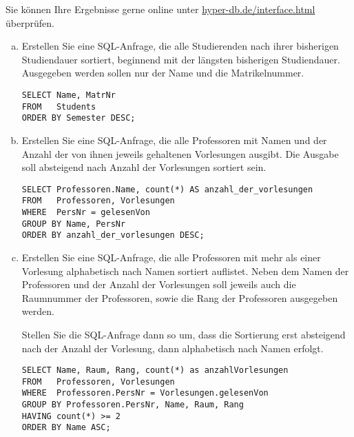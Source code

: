 \begin{normalText}

Sie können Ihre Ergebnisse gerne online unter \href{https://hyper-db.de/interface.html}{hyper-db.de/interface.html} überprüfen.

\begin{enumerate}[a)]
	\item Erstellen Sie eine SQL-Anfrage, die alle Studierenden nach ihrer 
	bisherigen Studiendauer sortiert, beginnend mit der längsten bisherigen 
	Studiendauer.
	Ausgegeben werden sollen nur der Name und die Matrikelnummer.

\cprotEnv
	\begin{note}
	\begin{lstlisting}
SELECT Name, MatrNr
FROM   Students
ORDER BY Semester DESC;
	\end{lstlisting}
	\end{note}

	\item Erstellen Sie eine SQL-Anfrage, die alle Professoren mit Namen und der Anzahl der von ihnen jeweils gehaltenen Vorlesungen ausgibt.
	Die Ausgabe soll absteigend nach Anzahl der Vorlesungen sortiert sein.

\cprotEnv
	\begin{note}
	\begin{lstlisting}
SELECT Professoren.Name, count(*) AS anzahl_der_vorlesungen
FROM   Professoren, Vorlesungen
WHERE  PersNr = gelesenVon
GROUP BY Name, PersNr
ORDER BY anzahl_der_vorlesungen DESC;
	\end{lstlisting}
	\end{note}

	\item Erstellen Sie eine SQL-Anfrage, die alle Professoren mit mehr als einer Vorlesung alphabetisch nach Namen sortiert auflistet.
	Neben dem Namen der Professoren und der Anzahl der Vorlesungen soll jeweils auch die Raumnummer der Professoren, sowie die Rang der Professoren ausgegeben werden.

	Stellen Sie die SQL-Anfrage dann so um, dass die Sortierung erst absteigend nach der Anzahl der Vorlesung, dann alphabetisch nach Namen erfolgt.

\cprotEnv
	\begin{note}
	\begin{lstlisting}
SELECT Name, Raum, Rang, count(*) as anzahlVorlesungen
FROM   Professoren, Vorlesungen
WHERE  Professoren.PersNr = Vorlesungen.gelesenVon
GROUP BY Professoren.PersNr, Name, Raum, Rang
HAVING count(*) >= 2
ORDER BY Name ASC;
	\end{lstlisting}


\end{note}
\end{enumerate}
\end{normalText}
